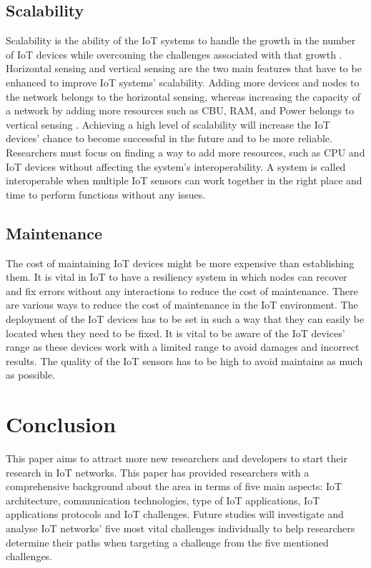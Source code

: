\documentclass[pmlr,twocolumn,10pt]{jmlr} %
\begin{document}
\subsection{Scalability }
Scalability is the ability of the IoT systems to handle the 
growth in the number of IoT devices while overcoming the 
challenges associated with that growth . Horizontal 
sensing and vertical sensing are the two main features that 
have to be enhanced to improve IoT systems' scalability. 
Adding more devices and nodes to the network belongs to 
the horizontal sensing, whereas increasing the capacity of a 
network by adding more resources such as CBU, RAM, and 
Power belongs to vertical sensing . Achieving a high 
level of scalability will increase the IoT devices' chance to 
become successful in the future and to be more reliable. 
Researchers must focus on finding a way to add more 
resources, such as CPU and IoT devices without affecting 
the system's interoperability. A system is called 
interoperable when multiple IoT sensors can work together 
in the right place and time to perform functions without any 
issues.

\subsection{ Maintenance }

The cost of maintaining IoT devices might be more 
expensive than establishing them. It is vital in IoT to have a 
resiliency system in which nodes can recover and fix errors 
without any interactions to reduce the cost of maintenance. 
There are various ways to reduce the cost of maintenance in 
the IoT environment. The deployment of the IoT devices 
has to be set in such a way that they can easily be located 
when they need to be fixed. It is vital to be aware of the IoT 
devices' range as these devices work with a limited range to 
avoid damages and incorrect results. The quality of the 
IoT sensors has to be high to avoid maintains as much as 
possible.


\section{Conclusion}

This paper aims to attract more new researchers and developers 
to start their research in IoT networks. This paper has 
provided researchers with a comprehensive background 
about the area in terms of five main aspects: IoT 
architecture, communication technologies, type of IoT 
applications, IoT applications protocols and IoT challenges. 
Future studies will investigate and analyse IoT networks' 
five most vital challenges individually to help researchers 
determine their paths when targeting a challenge from the 
five mentioned challenges. 
\end{document}
